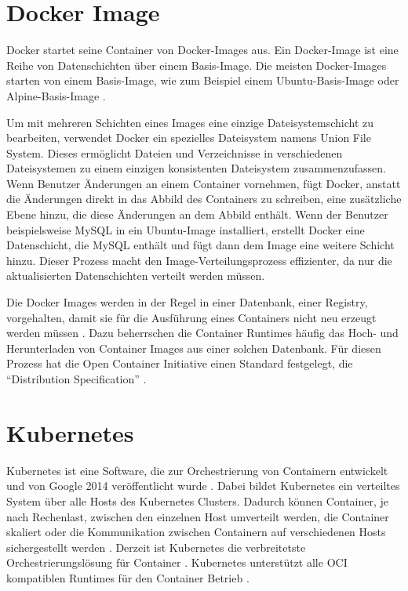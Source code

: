 \section{Docker Image}
Docker startet seine Container von Docker-Images aus. Ein Docker-Image ist eine Reihe von Datenschichten über einem Basis-Image. Die meisten Docker-Images starten von einem Basis-Image, wie zum Beispiel einem Ubuntu-Basis-Image \cite[vgl.][]{Ubuntu.20200220} oder Alpine-Basis-Image \cite[vgl.][]{Alpine.20200220}. 

Um mit mehreren Schichten eines Images eine einzige Dateisystemschicht zu bearbeiten, verwendet Docker ein spezielles Dateisystem namens Union File System. Dieses ermöglicht Dateien und Verzeichnisse in verschiedenen Dateisystemen zu einem einzigen konsistenten Dateisystem zusammenzufassen. \cite[vgl.][3]{Bui.13.01.2015}
Wenn Benutzer Änderungen an einem Container vornehmen, fügt Docker, anstatt die Änderungen direkt in das Abbild des Containers zu schreiben, eine zusätzliche Ebene hinzu, die diese Änderungen an dem Abbild enthält. Wenn der Benutzer beispielsweise MySQL in ein Ubuntu-Image installiert, erstellt Docker eine Datenschicht, die MySQL enthält und fügt dann dem Image eine weitere Schicht hinzu. Dieser Prozess macht den Image-Verteilungsprozess effizienter, da nur die aktualisierten Datenschichten verteilt werden müssen.

Die Docker Images werden in der Regel in einer Datenbank, einer Registry, vorgehalten, damit sie für die Ausführung eines Containers nicht neu erzeugt werden müssen \cite[vgl.][91]{Scholl.2019}. Dazu beherrschen die Container Runtimes häufig das Hoch- und Herunterladen von Container Images aus einer solchen Datenbank. Für diesen Prozess hat die Open Container Initiative einen Standard festgelegt, die "`Distribution Specification"' \cite[vgl.][]{HansJoachimBaader.20180410, OpenContainerInitiative.20200212}.

\section{Kubernetes}

Kubernetes ist eine Software, die zur Orchestrierung von Containern entwickelt und von Google 2014 veröffentlicht wurde  \cite[vgl.][7]{Scholl.2019}. Dabei bildet Kubernetes ein verteiltes System über alle Hosts des Kubernetes Clusters. Dadurch können Container, je nach Rechenlast, zwischen den einzelnen Host umverteilt werden, die Container skaliert oder die Kommunikation zwischen Containern auf verschiedenen Hosts sichergestellt werden \cite[vgl.][4]{Bernstein.2014}.
Derzeit ist Kubernetes die verbreitetste Orchestrierungslösung für Container \cite[vgl.][6]{sysdig.2019}.
Kubernetes unterstützt alle \ac{OCI} kompatiblen Runtimes für den Container Betrieb 
\cite[vgl.][7]{Scholl.2019}.

